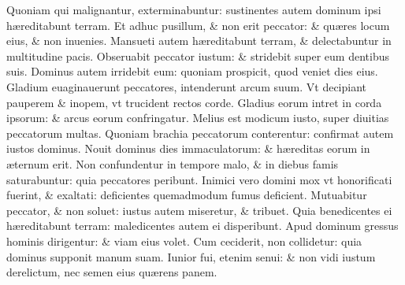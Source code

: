 \documentclass[a5paper,10pt]{book}
\def\ae{æ}
\begin{document}
\begin{multicols*}{2}
\newline \color{red} Q\color{black}uoniam qui malignantur, exterminabuntur: sustinentes autem dominum ipsi h\ae reditabunt terram.
\newline \color{red} E\color{black}t adhuc pusillum, \& non erit peccator: \& qu\ae res locum eius, \& non inuenies.
\newline \color{red} M\color{black}ansueti autem h\ae reditabunt terram, \& delectabuntur in multitudine pacis.
\newline \color{red} O\color{black}bseruabit peccator iustum: \& stridebit super eum dentibus suis.
\newline \color{red} D\color{black}ominus autem irridebit eum: quoniam prospicit, quod veniet dies eius.
\newline \color{red} G\color{black}ladium euaginauerunt peccatores, intenderunt arcum suum.
\newline \color{red} V\color{black}t decipiant pauperem \& inopem, vt trucident rectos corde.%
\newline \color{red} G\color{black}ladius eorum intret in corda ipsorum: \& arcus eorum confringatur.
\newline \color{red} M\color{black}elius est modicum iusto, super diuitias peccatorum multas.
\newline \color{red} Q\color{black}uoniam brachia peccatorum conterentur: confirmat autem iustos dominus.
\newline \color{red} N\color{black}ouit dominus dies immaculatorum: \& h\ae reditas eorum in \ae ternum erit.
\newline \color{red} N\color{black}on confundentur in tempore malo, \& in diebus famis saturabuntur: quia peccatores peribunt.
\newline \color{red} I\color{black}nimici vero domini mox vt honorificati fuerint, \& exaltati: deficientes quemadmodum fumus deficient.
\newline \color{red} M\color{black}utuabitur peccator, \& non soluet: iustus autem miseretur, \& tribuet.
\newline \color{red} Q\color{black}uia benedicentes ei h\ae reditabunt terram: maledicentes autem ei disperibunt.
\newline \color{red} A\color{black}pud dominum gressus hominis dirigentur: \& viam eius volet.
\newline \color{red} C\color{black}um ceciderit, non collidetur: quia dominus supponit manum suam.
\newline \color{red} I\color{black}unior fui, etenim senui: \& non vidi iustum derelictum, nec semen eius qu\ae rens panem.

\end{multicols*}
\end{document}
